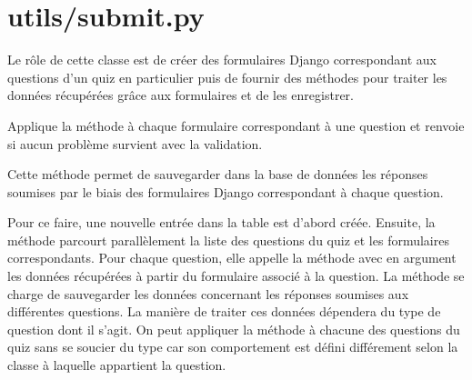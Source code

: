 \documentclass[a4,10pt,french]{sphinxmanual}
\begin{document}
\section{utils/submit.py}
\label{source:module-quiz.utils.submit}\label{source:utils-submit-py}

\begin{fulllineitems}
\label{source:quiz.utils.submit.QuizForms}
Le rôle de cette classe est de créer des formulaires Django correspondant aux
questions d'un quiz en particulier puis de fournir des méthodes pour traiter
les données récupérées grâce aux formulaires et de les enregistrer.

\begin{fulllineitems}
\label{source:quiz.utils.submit.QuizForms.are_valid}
Applique la méthode  à chaque formulaire correspondant à une
question et renvoie  si aucun problème survient avec la validation.

\end{fulllineitems}


\begin{fulllineitems}
\label{source:quiz.utils.submit.QuizForms.save_answers}
Cette méthode permet de sauvegarder dans la base de données les réponses
soumises par le biais des formulaires Django correspondant à chaque question.

Pour ce faire, une nouvelle entrée dans la table  est
d'abord créée. Ensuite, la méthode parcourt parallèlement la liste des questions
du quiz et les formulaires correspondants. Pour chaque question, elle appelle
la méthode  avec en argument les données récupérées à partir
du formulaire associé à la question. La méthode  se charge
de sauvegarder les données concernant les réponses soumises aux différentes
questions. La manière de traiter ces données dépendera du type de question
dont il s'agit. On peut appliquer la méthode  à chacune
des questions du quiz sans se soucier du type car son comportement est défini
différement selon la classe à laquelle appartient la question.

\end{fulllineitems}


\end{fulllineitems}
\end{document}
